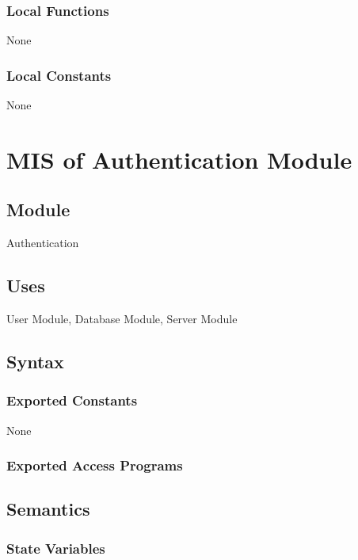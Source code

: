 \documentclass[12pt, titlepage]{article}
\begin{document}
\subsubsection{Local Functions}

None

\subsubsection{Local Constants}

None

\newpage

\section{MIS of Authentication Module} \label{mFM}

\subsection{Module}

Authentication

\subsection{Uses}

User Module, Database Module, Server Module

\subsection{Syntax}

\subsubsection{Exported Constants}
None

\subsubsection{Exported Access Programs}

\subsection{Semantics}

\subsubsection{State Variables}
\end{document}

